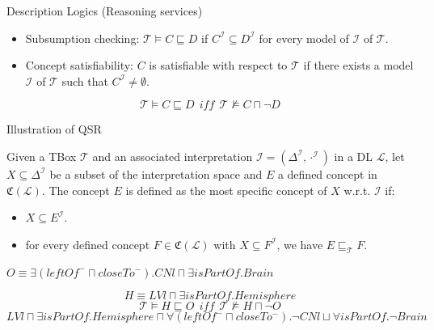 \documentclass{beamer}
\begin{document}
\begin{frame}{Description Logics (Reasoning services)}
\begin{itemize}
\item Subsumption checking: $\mathcal{T}\vDash C\sqsubseteq D$ if $C^\mathcal{I}\subseteq D^\mathcal{I}$ for every model of $\mathcal{I}$ of $\mathcal{T}$.
\item Concept satisfiability: $C$ is satisfiable with respect to $\mathcal{T}$ if there exists a model $\mathcal{I}$ of $\mathcal{T}$ such that $C^\mathcal{I}\neq \emptyset$.
\end{itemize}
\begin{block}{}
 $$ \mathcal{T}\vDash C\sqsubseteq D~~iff~~\mathcal{T}\nvDash C\sqcap \neg D $$
\end{block}
\end{frame}


\begin{frame}{Illustration of QSR}
 \begin{defn}
Given a TBox $\mathcal{T}$ and an associated interpretation $\mathcal{I}=(\Delta^{\mathcal{I}}, \cdot^{\mathcal{I}})$ in a DL $\mathcal{L}$,
let $X\subseteq \Delta^{\mathcal{I}}$ be a subset of the interpretation space and $E$ a defined concept in $\mathfrak{C}(\mathcal{L})$. 
The concept $E$ is defined as the most specific concept of $X$ w.r.t. $\mathcal{I}$ if:
\begin{itemize}
 \item $X \subseteq E^{\mathcal{I}}$.
 \item for every defined concept $F\in\mathfrak{C}(\mathcal{L})$ with $X \subseteq F^{\mathcal{I}}$, we have $E \sqsubseteq_{\mathcal{T}} F$.
\end{itemize}
\label{def:msc}
\end{defn}
\begin{exampleblock}{}
$O\equiv \exists (leftOf^-\sqcap closeTo^-). CNl\sqcap \exists isPartOf.Brain$
\end{exampleblock}
\begin{exampleblock}{}
$$H\equiv LVl\sqcap \exists isPartOf.Hemisphere$$
 $$ \mathcal{T}\vDash H\sqsubseteq O ~~iff~~ \mathcal{T}\nvDash H\sqcap \neg O $$
 $$LVl\sqcap \exists isPartOf.Hemisphere\sqcap \forall (leftOf^-\sqcap closeTo^-).\neg CNl\sqcup \forall isPartOf.\neg Brain$$
\end{exampleblock}


\end{frame}
\end{document}
